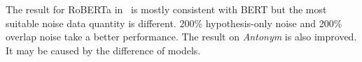The result for RoBERTa in~ is mostly consistent with BERT but the 
most suitable noise data quantity is different. 200\% hypothesis-only noise and 200\% overlap noise 
take a better performance. The result on \textit{Antonym} is also improved. It may be caused by the difference of 
models.
\begin{table}[]
	\centering
	\scriptsize
 \begin{tabular}{
        >{\centering\arraybackslash}m{}|
        >{\centering}p{}|
        >{\centering}p{}|
        >{\centering}p{}|
        >{\centering}p{}|
        >{\centering}p{}|
        >{\centering}p{}|
        >{\centering}p{}|
        >{\centering}p{}|
        >{\centering}p{}|
        c}



\end{tabular}
\end{table}
